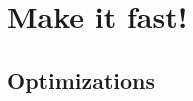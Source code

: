 \documentclass[a4paper,9pt]{beamer}
\begin{document}
%
%
%


\section{Make it fast!}
\begin{frame}
  \tableofcontents[currentsection]
\end{frame}
\subsection{Optimizations}
\end{document}
